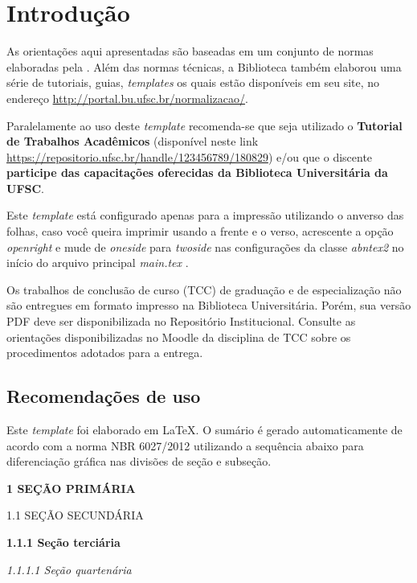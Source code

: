 \chapter{Introdução}

As orientações aqui apresentadas são baseadas em um conjunto de normas elaboradas pela . Além das normas técnicas, a Biblioteca também elaborou uma série de tutoriais, guias, \textit{templates} os quais estão disponíveis em seu site, no endereço \url{http://portal.bu.ufsc.br/normalizacao/}.

Paralelamente ao uso deste \textit{template} recomenda-se que seja utilizado o \textbf{Tutorial de Trabalhos Acadêmicos} (disponível neste link \url{https://repositorio.ufsc.br/handle/123456789/180829}) e/ou que o discente \textbf{participe das capacitações oferecidas da Biblioteca Universitária da UFSC}.

Este \textit{template} está configurado apenas para a impressão utilizando o anverso das folhas, caso você queira imprimir usando a frente e o verso, acrescente a opção \textit{openright} e mude de \textit{oneside} para \textit{twoside} nas configurações da classe \textit{abntex2} no início do arquivo principal \textit{main.tex} \cite{abntex2classe}.

Os trabalhos de conclusão de curso (TCC) de graduação e de especialização não são entregues em formato impresso na Biblioteca Universitária. Porém, sua versão PDF deve ser disponibilizada no Repositório Institucional. Consulte as orientações disponibilizadas no Moodle da disciplina de TCC sobre os procedimentos adotados para a entrega.

\section{Recomendações de uso}
Este \textit{template} foi elaborado em \LaTeX. O sumário é gerado automaticamente de acordo com a norma NBR 6027/2012 utilizando a sequência abaixo para diferenciação gráfica nas divisões de seção e subseção.

\vspace{12pt}

\textbf{1 SEÇÃO PRIMÁRIA}

1.1 SEÇÃO SECUNDÁRIA

\textbf{1.1.1 Seção terciária}

\textit{1.1.1.1 Seção quartenária}


